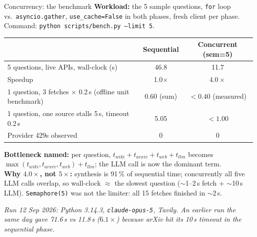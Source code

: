 \documentclass[aspectratio=169,11pt]{beamer}
\begin{document}
\begin{frame}{Concurrency: the benchmark}
  \textbf{Workload:} the 5 sample questions, \texttt{for} loop vs.\ \texttt{asyncio.gather}, \texttt{use\_cache=False} in both phases, fresh client per phase. Command: \texttt{python scripts/bench.py --limit 5}.

  \vspace{0.3em}
  \begin{center}\small
  \begin{tabular}{lcc}
    \toprule
    & \textbf{Sequential} & \textbf{Concurrent (sem=5)} \\
    \midrule
    5 questions, live APIs, wall-clock (s) & 46.8 & 11.7 \\
    Speedup & 1.0$\times$ & $4.0\times$ \\
    1 question, 3 fetches $\times$ 0.2\,s (offline unit benchmark) & 0.60 (sum) & $<0.40$ (measured) \\
    1 question, one source stalls 5\,s, timeout 0.2\,s & 5.05 & $<1.00$ \\
    Provider 429s observed & 0 & 0 \\
    \bottomrule
  \end{tabular}
  \end{center}

  \vspace{0.3em}
  \textbf{Bottleneck named:} per question, $t_{wiki}+t_{arxiv}+t_{web}+t_{llm}$ becomes $\max(t_{wiki},t_{arxiv},t_{web})+t_{llm}$; the LLM call is now the dominant term.\\
  \textbf{Why $4.0\times$, not $5\times$:} synthesis is 91\,\% of sequential time; concurrently all five LLM calls overlap, so wall-clock $\approx$ the slowest question ($\sim$1--2\,s fetch + $\sim$10\,s LLM). \texttt{Semaphore(5)} was not the limiter: all 15 fetches finished in $\sim$2\,s.

  \vspace{0.2em}
  {\footnotesize\textit{Run 12 Sep 2026: Python 3.14.3, \texttt{claude-opus-5}, Tavily. An earlier run the same day gave 71.6\,s vs 11.8\,s ($6.1\times$) because arXiv hit its 10\,s timeout in the sequential phase.}}
\end{frame}
\end{document}
